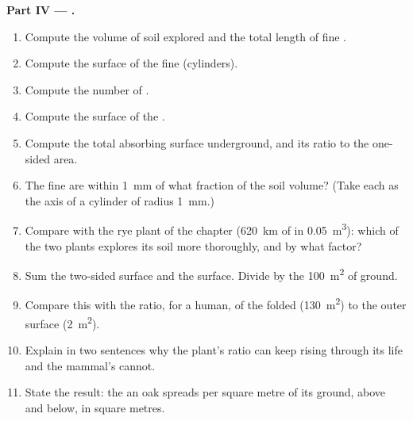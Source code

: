 \begin{problem}
\medskip
\noindent\textbf{Part IV --- .}
\begin{enumerate}[resume]
  \item Compute the volume of soil explored and the total length of
        fine .
  \item Compute the surface of the fine  (cylinders).
  \item Compute the number of .
  \item Compute the surface of the .
  \item Compute the total absorbing surface underground, and its ratio
        to the one-sided  area.
  \item The fine  are within \qty{1}{mm} of what fraction of the
        soil volume? (Take each  as the axis of a cylinder of
        radius \qty{1}{mm}.)
  \item Compare with the rye plant of the chapter (\qty{620}{km} of
         in \qty{0.05}{m^3}): which of the two plants explores its
        soil more thoroughly, and by what factor?
  \item Sum the two-sided  surface and the  surface. Divide by
        the \qty{100}{m^2} of ground.
  \item Compare this with the ratio, for a human, of the folded
         (\qty{130}{m^2}) to the outer surface
        (\qty{2}{m^2}).
  \item Explain in two sentences why the plant's ratio can keep rising
        through its life and the mammal's cannot.
  \item State the result: the  an oak spreads per
        square metre of its ground, above and below, in square metres.
\end{enumerate}
\end{problem}
